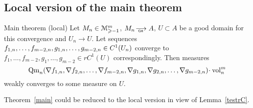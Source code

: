 

 
 
 
 \subsection{Local version of the main theorem }\label{sec:loc}
 
 
\begin{thm}{Main theorem (local)}\label{mainloc}
Let   
$M_n\in\mathcal M_{\geqslant -1}^m$,
$M_n\GHto A$, 
  $U\subset A$ be a good domain for this convergence
  and $U_n\to U$.
  Let sequences $f_{1,n},\dots,f_{m-2,n},\\ g_{1,n},\dots,g_{m-2,n}\in C^1(U_n)$ 
 converge to
   $f_1,\dots, f_{m-2}, g_1,\dots, g_{m-2}\in rC^1(U)$ correspondingly.
Then measures 
$$\Qm_n(\nabla f_{1,n},\nabla f_{2,n},\dots,\nabla f_{m-2,n},
\nabla g_{1,n},\nabla g_{2,n},\dots,\nabla g_{m-2,n})\cdot\vol^m_n$$ weakly converges to some
measure on $U$.
\end{thm}

Theorem~\ref{main} could be reduced to the local version
in view of Lemma~\ref{testrC}.
